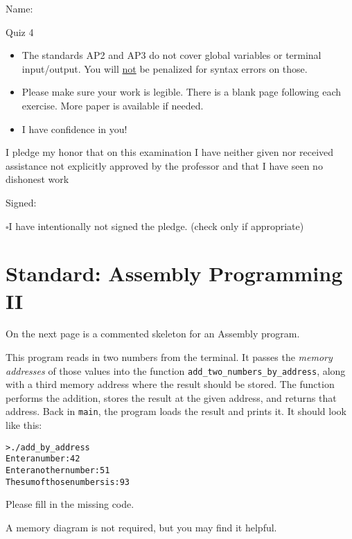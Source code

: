 \documentclass[12pt]{article}
\begin{document}
Name: \makebox[3in]{\hrulefill}

\vfill

\begin{center}
{\huge Quiz 4}
\end{center}

\begin{itemize}
    \item The standards AP2 and AP3 do not cover global variables or terminal input/output. You will \underline{not} be penalized for syntax errors on those.
    \item Please make sure your work is legible. There is a blank page following each exercise. More paper is available if needed.
    \item I have confidence in you!
\end{itemize}

\vfill

I pledge my honor that on this examination I have neither given nor received assistance not explicitly approved by the professor and that I have seen no dishonest work 

\hfill Signed: \makebox[3in]{\hrulefill}

$\square$\quad I have intentionally not signed the pledge. (check only if appropriate)
\newpage

\section*{Standard: Assembly Programming II}

On the next page is a commented skeleton for an Assembly program. 

This program reads in two numbers from the terminal. It passes the \textit{memory addresses} of those values into the function \texttt{add\_two\_numbers\_by\_address}, along with a third memory address where the result should be stored. The function performs the addition, stores the result at the given address, and returns that address. Back in \texttt{main}, the program loads the result and prints it. It should look like this:

\begin{alltt}
    > ./add_by_address
    Enter a number: 42
    Enter another number: 51
    The sum of those numbers is: 93
\end{alltt}

Please fill in the missing code. 

A memory diagram is not required, but you may find it helpful.
\end{document}
